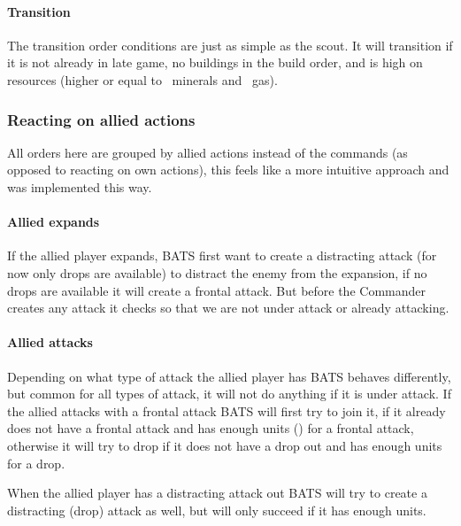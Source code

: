 \paragraph{Transition}
The transition order conditions are just as simple as the scout. It will transition if it is not
already in late game, no buildings in the build order, and is high on resources (higher or equal to
\classificationHighOnMinerals~minerals and \classificationHighOnGas~gas).

\subsubsection{Reacting on allied actions} All orders here are grouped by allied actions instead of
the commands (as opposed to reacting on own actions), this feels like a more intuitive approach and
was implemented this way.

\paragraph{Allied expands} If the allied player expands, BATS first want to create a distracting
attack (for now only drops are available) to distract the enemy from the expansion, if no drops are
available it will create a frontal attack. But before the Commander creates any attack it checks so
that we are not under attack or already attacking.

\paragraph{Allied attacks} Depending on what type of attack the allied player has BATS behaves
differently, but common for all types of attack, it will not do anything if it is under attack. If
the allied attacks with a frontal attack BATS will first try to join it, if it already does not have
a frontal attack and has enough units (\classificationFrontalAttackUnitsMin) for a frontal attack,
otherwise it will try to drop if it does not have a drop out and has enough units for a drop.

When the allied player has a distracting attack out BATS will try to create a distracting (drop)
attack as well, but will only succeed if it has enough units.
